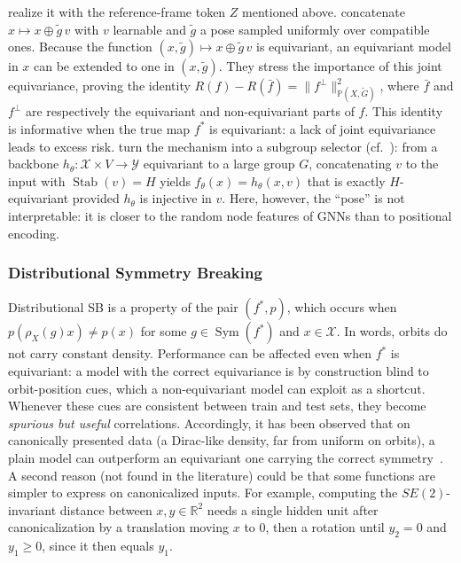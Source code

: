\documentclass[mathematics,review,submit,moreauthors]{Definitions/mdpi}
\begin{document}
\citet{vadgama2025} realize it with the reference-frame token $Z$ mentioned above.
\citet{lawrence2024} concatenate $x\mapsto x\oplus\tilde g\,v$ with $v$ learnable and $\tilde g$ a pose sampled uniformly over compatible ones.
Because the function $(x,\tilde g)\mapsto x\oplus\tilde g\,v$ is equivariant, an equivariant model in $x$ can be extended to one in $(x,\tilde g)$.
They stress the importance of this joint equivariance, proving the identity $R(f)-R(\bar f) = \|f^{\perp}\|_{\mathbb{P}(X,\tilde G)}^{2}$, where $\bar f$ and $f^\perp$ are respectively the equivariant and non-equivariant parts of $f$.
This identity is informative when the true map $f^*$ is equivariant: a lack of joint equivariance leads to excess risk.
\citet{goel2025} turn the mechanism into a subgroup selector (cf.\ ): from a backbone $h_\theta:\mathcal{X}\times V\to\mathcal{Y}$ equivariant to a large group $G$, concatenating $v$ to the input with $\operatorname{Stab}(v)=H$ yields $f_\theta(x)=h_\theta(x,v)$ that is exactly $H$-equivariant provided $h_\theta$ is injective in $v$.
Here, however, the ``pose'' is not interpretable: it is closer to the random node features of GNNs than to positional encoding.

\subsubsection{Distributional Symmetry Breaking}\label{sec:distributional-sb}
Distributional SB is a property of the pair $(f^*, p)$, which occurs when $p(\rho_X(g)x)\neq p(x)$ for some $g\in \operatorname{Sym}(f^*)$ and $x\in\mathcal{X}$.
In words, orbits do not carry constant density.
Performance can be affected even when $f^*$ is equivariant: a model with the correct equivariance is by construction blind to orbit-position cues, which a non-equivariant model can exploit as a shortcut.
Whenever these cues are consistent between train and test sets, they become \emph{spurious but useful} correlations.
Accordingly, it has been observed that on canonically presented data (a Dirac-like density, far from uniform on orbits), a plain model can outperform an equivariant one carrying the correct symmetry~\citep{lawrence2026,rygiel2026}.
A second reason (not found in the literature) could be that some functions are simpler to express on canonicalized inputs.
For example, computing the $SE(2)$-invariant distance between $x,y\in\mathbb{R}^2$ needs a single hidden unit after canonicalization by a translation moving $x$ to $0$, then a rotation until $y_2=0$ and $y_1\geq 0$, since it then equals $y_1$.
\end{document}

